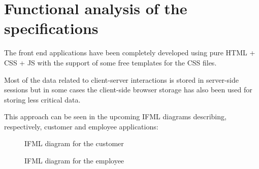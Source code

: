 
\chapter{Functional analysis of the specifications}

The front end applications have been completely developed using pure HTML + CSS + JS with the support of some free templates for the CSS files.

Most of the data related to client-server interactions is stored in server-side sessions but in some cases the client-side browser storage has also been used for storing less critical data.

This approach can be seen in the upcoming IFML diagrams describing, respectively, customer and employee applications:

\begin{landscape}
    \thispagestyle{landscape}
    \begin{figure}[!htbp]
        \vspace*{-\oddsidemargin * 2}
        \centerline{}
        \caption{IFML diagram for the customer}
        \label{fig:ifml_diagram_customer}
        \vspace{-100pt}
    \end{figure}
\end{landscape}

\begin{landscape}
    \thispagestyle{landscape}
    \begin{figure}[p]
        \vspace*{-\oddsidemargin * 2}
        \centerline{}
        \caption{IFML diagram for the employee}
        \label{fig:ifml_diagram_employee}
    \end{figure}
\end{landscape}